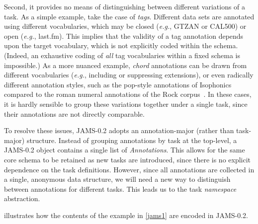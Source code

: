 \documentclass{article}
\begin{document}
Second, it provides no means of distinguishing between different variations of a task.
As a simple example, take the case of \emph{tags}.
Different data sets are annotated using different vocabularies, which may be closed
(\emph{e.g.}, GTZAN or CAL500) or open (\emph{e.g.}, last.fm).
This implies that the validity of a tag annotation depends upon the target vocabulary, which is not explicitly coded within the schema.
(Indeed, an exhaustive coding of \emph{all} tag vocabularies within a fixed schema is impossible.) 
As a more nuanced example, \emph{chord} annotations can be drawn from different vocabularies (\emph{e.g.}, including or suppressing extensions),
or even radically different annotation styles, such as the pop-style annotations of
Isophonics~\cite{isophonicsbeatles} compared to the roman numeral annotations of the
Rock corpus~\cite{de2011corpus}.
In these cases, it is hardly sensible to group these variations together under a single task, since their annotations are not directly
comparable.

To resolve these issues, JAMS-0.2 adopts an an\-notation-major (rather than task-major) structure.
Instead of grouping annotations by task at the top-level, a JAMS-0.2 object contains a single list of \emph{Annotations}.
This allows for the same core schema to be retained as new tasks are introduced, since there is no explicit dependence on the task
definitions.
However, since all annotations are collected in a single, anonymous data structure, we will need a new way to distinguish between annotations for different tasks.
This leads us to the task \emph{namespace} abstraction.

 illustrates how the contents of the example in \cref{jams1} are encoded in
JAMS-0.2.
\end{document}

